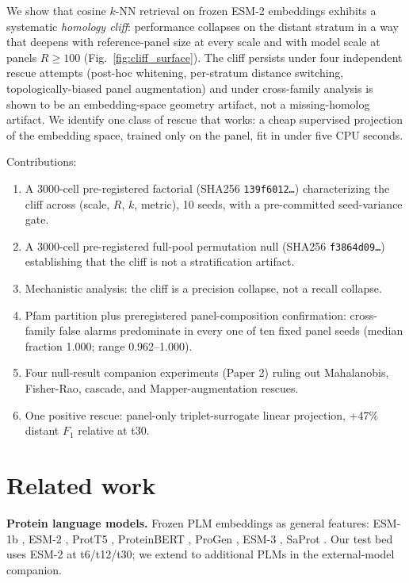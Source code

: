 \documentclass[11pt]{article}
\begin{document}
We show that cosine $k$-NN retrieval on frozen ESM-2 embeddings exhibits a systematic \emph{homology cliff}: performance collapses on the distant stratum in a way that deepens with reference-panel size at every scale and with model scale at panels $R\geq100$ (Fig.~\ref{fig:cliff_surface}). The cliff persists under four independent rescue attempts (post-hoc whitening, per-stratum distance switching, topologically-biased panel augmentation) and under cross-family analysis is shown to be an embedding-space geometry artifact, not a missing-homolog artifact. We identify one class of rescue that works: a cheap supervised projection of the embedding space, trained only on the panel, fit in under five CPU seconds.

Contributions:
\begin{enumerate}
\item A 3000-cell pre-registered factorial (SHA256 \texttt{139f6012\ldots}) characterizing the cliff across (scale, $R$, $k$, metric), 10 seeds, with a pre-committed seed-variance gate.
\item A 3000-cell pre-registered full-pool permutation null (SHA256 \texttt{f3864d09\ldots}) establishing that the cliff is not a stratification artifact.
\item Mechanistic analysis: the cliff is a precision collapse, not a recall collapse.
\item Pfam partition plus preregistered panel-composition confirmation: cross-family false alarms predominate in every one of ten fixed panel seeds (median fraction 1.000; range 0.962--1.000).
\item Four null-result companion experiments (Paper 2) ruling out Mahalanobis, Fisher-Rao, cascade, and Mapper-augmentation rescues.
\item One positive rescue: panel-only triplet-surrogate linear projection, +47\% distant $F_1$ relative at t30.
\end{enumerate}


\section{Related work}
\textbf{Protein language models.} Frozen PLM embeddings as general features: ESM-1b \cite{rives2021biological}, ESM-2 \cite{lin2023evolutionary}, ProtT5 \cite{elnaggar2022prottrans}, ProteinBERT \cite{brandes2022proteinbert}, ProGen \cite{madani2023progen}, ESM-3 \cite{hayes2024esm3}, SaProt \cite{su2023saprot}. Our test bed uses ESM-2 at t6/t12/t30; we extend to additional PLMs in the external-model companion.
\end{document}
